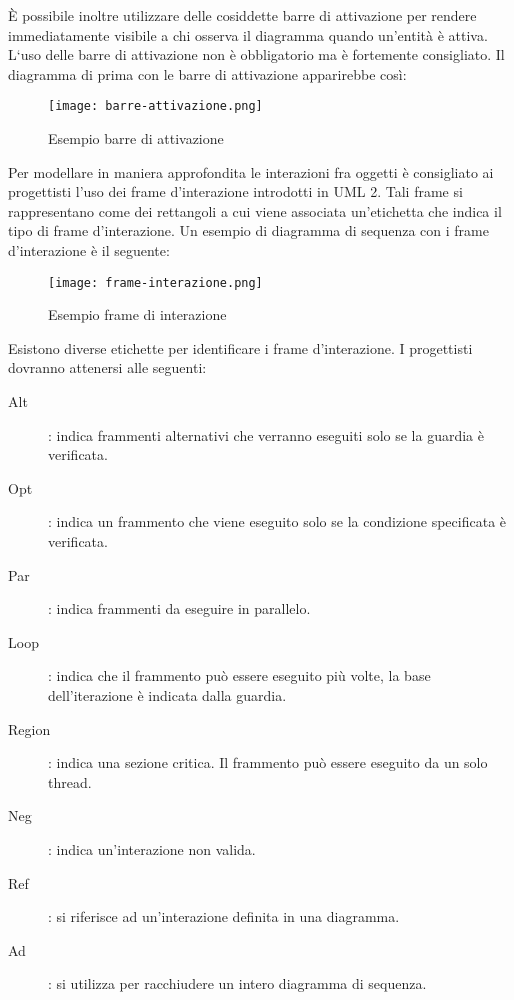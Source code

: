 \documentclass[../../norme-di-progetto.tex]{subfiles}
\begin{document}
È possibile inoltre utilizzare delle cosiddette barre di attivazione per rendere immediatamente visibile a chi osserva il diagramma quando un'entità è attiva.
L`uso delle barre di attivazione non è obbligatorio ma è fortemente consigliato.
Il diagramma di prima con le barre di attivazione apparirebbe così:
\begin{figure}[H]%
  \label{fig:barre_attivazione}
  \texttt{[image: barre-attivazione.png]}
  \centering
  \caption{Esempio barre di attivazione}
\end{figure}
Per modellare in maniera approfondita le interazioni fra oggetti è consigliato ai progettisti l'uso dei frame d'interazione introdotti in UML 2.
Tali frame si rappresentano come dei rettangoli a cui viene associata un'etichetta che indica il tipo di frame d'interazione.
Un esempio di diagramma di sequenza con i frame d'interazione è il seguente:
\begin{figure}[H]%
  \label{fig:frame_di_interazione}
  \texttt{[image: frame-interazione.png]}
  \centering
  \caption{Esempio frame di interazione}
\end{figure}
Esistono diverse etichette per identificare i frame d'interazione. I progettisti dovranno attenersi alle seguenti:
\begin{description}
  \item [Alt]: indica frammenti alternativi che verranno eseguiti solo se la guardia è verificata.
  \item [Opt]: indica un frammento che viene eseguito solo se la condizione specificata è verificata.
  \item [Par]: indica frammenti da eseguire in parallelo.
  \item [Loop]: indica che il frammento può essere eseguito più volte, la base dell'iterazione è indicata dalla guardia.
  \item [Region]: indica una sezione critica. Il frammento può essere eseguito da un solo thread.
  \item [Neg]: indica un'interazione non valida.
  \item [Ref]: si riferisce ad un'interazione definita in una diagramma.
  \item [Ad]: si utilizza per racchiudere un intero diagramma di sequenza.
\end{description}
\end{document}
